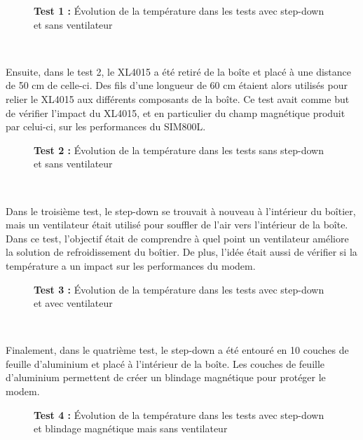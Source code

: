 \begin{figure}[h!]
  \centering
  
  \label{fig:test_1}
  \vspace{-1cm}
  \caption{\textbf{Test 1 :} Évolution de la température dans les tests avec step-down et sans ventilateur}
\end{figure}

~

\noindent
Ensuite, dans le test 2, le XL4015 a été retiré de la boîte et placé à une distance de 50 cm de celle-ci. Des fils d'une longueur de 60 cm étaient alors utilisés pour relier le XL4015 aux différents composants de la boîte. Ce test avait comme but de vérifier l'impact du XL4015, et en particulier du champ magnétique produit par celui-ci, sur les performances du SIM800L.

\begin{figure}[ht!]
  \centering
  
  \label{fig:test_2}
  \vspace{-1cm}
  \caption{\textbf{Test 2 :} Évolution de la température dans les tests sans step-down et sans ventilateur}
\end{figure}

~

\noindent
Dans le troisième test, le step-down se trouvait à nouveau à l'intérieur du boîtier, mais un ventilateur était utilisé pour souffler de l'air vers l'intérieur de la boîte. Dans ce test, l'objectif était de comprendre à quel point un ventilateur améliore la solution de refroidissement du boîtier. De plus, l'idée était aussi de vérifier si la température a un impact sur les performances du modem.

\begin{figure}[ht!]
  \centering
  
  \label{fig:test_3}
  \vspace{-1cm}
  \caption{\textbf{Test 3 :} Évolution de la température dans les tests avec step-down et avec ventilateur}
\end{figure}

~

\noindent
Finalement, dans le quatrième test, le step-down a été entouré en 10 couches de feuille d'aluminium et placé à l'intérieur de la boîte. Les couches de feuille d'aluminium permettent de créer un blindage magnétique pour protéger le modem.


\begin{figure}[h!]
  \centering
  
  \label{fig:test_4}
  \vspace{-0.2cm}
  \caption{\textbf{Test 4 :} Évolution de la température dans les tests avec step-down et blindage magnétique mais sans ventilateur}
\end{figure}


